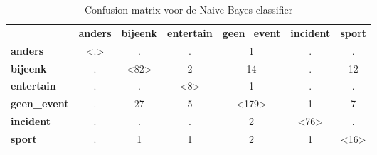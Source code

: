 {{\begin{table}[H]
\centering
\caption{Confusion matrix voor de Naive Bayes classifier}\label{naivebayes}
\vspace*{-5pt}
\begin{tabular}{lcccccc}
& \multicolumn{1}{l}{\textbf{anders}}            & \multicolumn{1}{l}{\textbf{bijeenk}}              & \multicolumn{1}{l}{\textbf{entertain}}            & \multicolumn{1}{l}{\textbf{geen\_event}}              & \multicolumn{1}{l}{\textbf{incident}}             & \multicolumn{1}{l}{\textbf{sport}}    \\ \cline{2-7} 
\multicolumn{1}{l|}{\textbf{anders}} & \multicolumn{1}{c|}{\textless.\textgreater} & \multicolumn{1}{c|}{.}                        & \multicolumn{1}{c|}{.}                      & \multicolumn{1}{c|}{1}                        & \multicolumn{1}{c|}{.}                       & \multicolumn{1}{c|}{.}              \\ \cline{2-7} 
\multicolumn{1}{l|}{\textbf{bijeenk}} & \multicolumn{1}{c|}{.}                      & \multicolumn{1}{c|}{\textless82\textgreater} & \multicolumn{1}{c|}{2}                     & \multicolumn{1}{c|}{14}                        & \multicolumn{1}{c|}{.}                       & \multicolumn{1}{c|}{12}              \\ \cline{2-7} 
\multicolumn{1}{l|}{\textbf{entertain}} & \multicolumn{1}{c|}{.}                      & \multicolumn{1}{c|}{.}                        & \multicolumn{1}{c|}{\textless8\textgreater} & \multicolumn{1}{c|}{1}                        & \multicolumn{1}{c|}{.}                       & \multicolumn{1}{c|}{.}              \\ \cline{2-7} 
\multicolumn{1}{l|}{\textbf{geen\_event}} & \multicolumn{1}{c|}{.}                      & \multicolumn{1}{c|}{27}                       & \multicolumn{1}{c|}{5}                      & \multicolumn{1}{c|}{\textless179\textgreater} & \multicolumn{1}{c|}{1}                       & \multicolumn{1}{c|}{7}              \\ \cline{2-7} 
\multicolumn{1}{l|}{\textbf{incident}} & \multicolumn{1}{c|}{.}                      & \multicolumn{1}{c|}{.}                        & \multicolumn{1}{c|}{.}                      & \multicolumn{1}{c|}{2}                        & \multicolumn{1}{c|}{\textless76\textgreater} & \multicolumn{1}{c|}{.}              \\ \cline{2-7} 
\multicolumn{1}{l|}{\textbf{sport}} & \multicolumn{1}{c|}{.}                      & \multicolumn{1}{c|}{1}                        & \multicolumn{1}{c|}{1}                      & \multicolumn{1}{c|}{2}                        & \multicolumn{1}{c|}{1}                       & \multicolumn{1}{c|}{\textless16\textgreater} \\ \cline{2-7} 
\end{tabular}
\end{table}

}}
